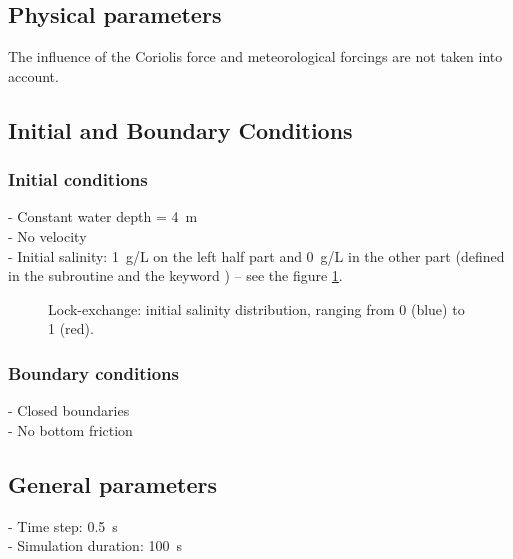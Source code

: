 \subsection{Physical parameters}
%
The influence of the Coriolis force and meteorological forcings
are not taken into account.
%

\subsection{Initial and Boundary Conditions}
%
\subsubsection{Initial conditions}
%
- Constant water depth = 4~m\\
- No velocity\\
- Initial salinity: 1~g/L on the left half part and 0~g/L in the other
part (defined in the subroutine  and the keyword
) -- see the figure \ref{fig:lock-initial_salinity}.
\begin{figure}[ht]
  \begin{center}
        \caption{Lock-exchange: initial salinity distribution, ranging from 0 (blue)
          to 1 (red).}
    \label{fig:lock-initial_salinity}
  \end{center}
\end{figure}
%
\subsubsection{Boundary conditions}
%
- Closed boundaries\\
- No bottom friction
%
\subsection{General parameters}
%
- Time step: 0.5~s\\
- Simulation duration: 100~s
%
%
%
